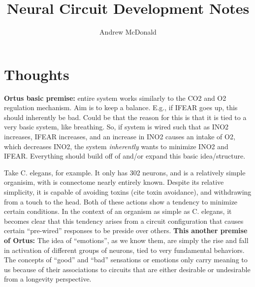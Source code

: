 \documentclass[11pt, a4paper, oneside]{article}   	%
\title{Neural Circuit Development Notes}
\author{Andrew McDonald}
\begin{document}
\maketitle


\section{Thoughts}



\textbf{Ortus basic premise:} entire system works similarly to the CO2 and O2 regulation mechanism. Aim is to keep a balance. E.g., if IFEAR goes up, this should inherently be bad. Could be that the reason for this is that it is tied to a very basic system, like breathing. So, if system is wired such that as INO2 increases, IFEAR increases, and an increase in INO2 causes an intake of O2, which decreases INO2, the system \textit{inherently} wants to minimize INO2 and IFEAR. Everything should build off of and/or expand this basic idea/structure.

Take C. elegans, for example. It only has 302 neurons, and is a relatively simple organisim, with is connectome nearly entirely known. Despite its relative simplicity, it is capable of avoiding toxins (cite toxin avoidance), and withdrawing from a touch to the head. Both of these actions show a tendency to minimize certain conditions. In the context of an organism as simple as C. elegans, it becomes clear that this tendency arises from a circuit configuration that causes certain ``pre-wired'' responses to be preside over others. \textbf{This another premise of Ortus:} The idea of ``emotions'', as we know them, are simply the rise and fall in activation of different groups of neurons, tied to very fundamental behaviors. The concepts of ``good'' and ``bad'' sensations or emotions only carry meaning to us because of their associations to circuits that are either desirable or undesirable from a longevity perspective.
\end{document}
